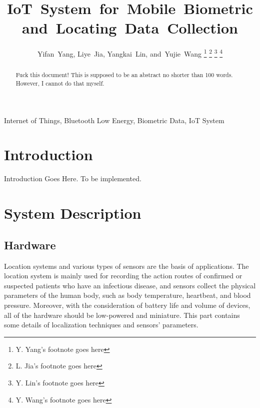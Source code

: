 \documentclass[10pt,journal,final,a4paper,nofonttune]{IEEEtran}
\title{IoT~System~for~Mobile~Biometric and~Locating~Data~Collection}
\author{Yifan~Yang,
        Liye~Jia,
        Yangkai~Lin,
        and~Yujie~Wang
\thanks{Y. Yang's footnote goes here}%
\thanks{L. Jia's footnote goes here}%
\thanks{Y. Lin's footnote goes here}%
\thanks{Y. Wang's footnote goes here}}
\begin{document}
\maketitle

\begin{abstract}
    Fuck this document! This is supposed to be an abstract no shorter 
    than 100 words. However, I cannot do that myself.
\end{abstract}

\begin{IEEEkeywords}
    Internet of Things, Bluetooth Low Energy, Biometric Data, IoT System
\end{IEEEkeywords}


\section{Introduction}
 Introduction Goes Here. To be implemented. 




\section{System Description}






\subsection{Hardware} 
Location systems and various types of sensors are the basis of applications. The location system is mainly used for recording the action routes of confirmed or suspected patients who have an infectious disease, and sensors collect the physical parameters of the human body, such as body temperature, heartbeat, and blood pressure. Moreover, with the consideration of battery life and volume of devices, all of the hardware should be low-powered and miniature. This part contains some details of localization techniques and sensors’ parameters.
\end{document}
